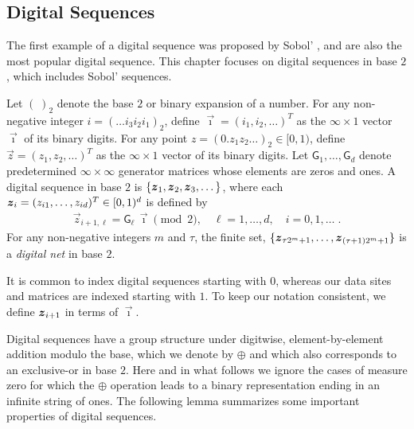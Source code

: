 \documentclass[graybox,footinfo]{svmult}
\begin{document}
\subsection{Digital Sequences} \label{FJ:sec:sobol}


The first example of a digital sequence was proposed by Sobol' \cite{Sob67}, and  are also the most popular digital sequence. This chapter focuses on digital sequences in base $2$, which includes Sobol' sequences. 

\begin{definition} \label{FJ:def:digitalseq}  Let  ${(\;)}_2$ denote the base $2$ or binary expansion of a number.
	For any non-negative integer $i = (\dots i_3 i_2 i_1)_2$, define $\overrightarrow{\imath} = (i_1, i_2, \dots)^T$ as the $\infty \times 1$ vector $\overrightarrow{\imath}$ of its binary digits. 
	For any point $z = ({0.z_1 z_2 \dots })_2 \in [0, 1)$, define $\overrightarrow{z} = (z_1, z_2, \dots)^T$ as the $\infty \times 1$ vector of its binary digits. 
	Let $ \mathsf{G}_1, \dots , \mathsf{G}_d$ denote predetermined $\infty \times \infty$ generator matrices whose elements are zeros and ones. 
	A digital sequence in base $2$ is $\{{\boldsymbol{z}}_1, {\boldsymbol{z}}_2, {\boldsymbol{z}}_3, \dots\}$, where each ${\boldsymbol{z}}_i = ( z_{i1}, \dots , z_{id})^T \in [0, 1)^d$ is defined by
	\begin{align*}
	\overrightarrow{z}_{i+1,\ell} = \mathsf{G}_{\ell} \, \overrightarrow{\imath} \pmod 2,  \quad \ell = 1, \dots, d, \quad i = 0, 1, \dots \;.
	\end{align*}
For any non-negative integers $m$ and $\tau$, the finite set, $\{{\boldsymbol{z}}_{\tau 2^m +1}, \ldots, {\boldsymbol{z}}_{(\tau+1)2^m +1}\}$ is a \emph{digital net} in base $2$.
\end{definition}

It is common to index digital sequences starting with $0$, whereas our data sites and matrices  are indexed starting with $1$.  To keep our notation consistent, we define ${\boldsymbol{z}}_{i+1}$ in terms of $\overrightarrow{\imath}$.

Digital sequences have a group structure under digitwise, element-by-element addition modulo the base, which we denote by $\oplus$ and which also corresponds to an exclusive-or in base $2$. Here and in what follows we ignore the cases of measure zero for which the $\oplus$ operation leads to a binary representation ending in an infinite string of ones.  The following lemma summarizes some important properties of digital sequences. 
\end{document}

